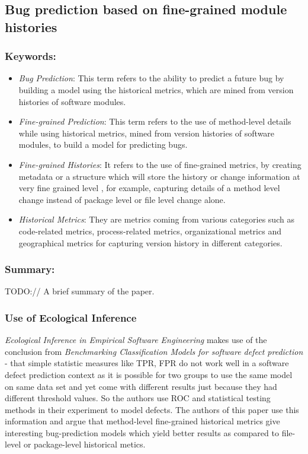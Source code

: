 \documentclass{sig-alternate-05-2015}
\begin{document}
\subsection{Bug prediction based on fine-grained module histories \cite{Hata:2012}}

\subsubsection{Keywords:}
\begin{itemize}
\item \emph{Bug Prediction}:  This term refers to the ability to predict a future bug by building a model using the historical metrics, which are mined from version histories of software modules.
\item \emph{Fine-grained Prediction}: This term refers to the use of method-level details while using historical metrics, mined from version histories of software modules, to build a model for predicting bugs.
\item \emph{Fine-grained Histories}: It refers to the use of fine-grained metrics, by creating metadata or a structure which will store the history or change information at very fine grained level , for example, capturing details of a method level change instead of package level or file level change alone.
\item \emph{Historical Metrics}: They are metrics coming from various categories such as code-related metrics, process-related metrics, organizational metrics and geographical metrics for capturing version history in different categories.
\end{itemize} 

\subsubsection{Summary:}
TODO:// A brief summary of the paper.

\subsubsection{Use of Ecological Inference}
\emph{Ecological Inference in Empirical Software Engineering} makes use of the conclusion from \emph{Benchmarking Classification Models for software defect prediction} - that simple statistic measures like TPR, FPR do not work well in a software defect prediction context as it is possible for two groups to use the same model on same data set and yet come with different results just because they had different threshold values. So the authors use ROC and statistical testing methods in their experiment to model defects. The authors of this paper use this information and argue that method-level fine-grained historical metrics give interesting bug-prediction models which yield better results as compared to file-level or package-level historical metics.
\end{document}
